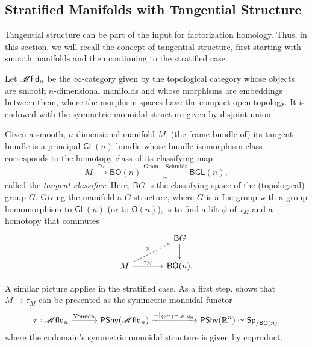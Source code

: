 \documentclass[../text]{subfiles}
\begin{document}
\subsection{Stratified Manifolds with Tangential Structure}

Tangential structure can be part of the input for factorization homology. Thus, in this section, we will recall the concept of tangential structure, first starting with smooth manifolds and then continuing to the stratified case.

\begin{definition}
    Let $\mfld_n$ be the $\infty$-category given by the topological category whose objects are smooth $n$-dimensional manifolds and whose morphisms are embeddings between them, where the morphism spaces have the compact-open topology. It is endowed with the symmetric monoidal structure given by disjoint union.
\end{definition}

Given a smooth, $n$-dimensional manifold $M$, (the frame bundle of) its tangent bundle is a principal $\mathsf{GL}(n)$-bundle whose bundle isomorphism class corresponds to the homotopy class of its classifying map
%
\begin{equation}
    M \xrightarrow{\ \ \tau_M \ \ } \mathsf{BO}(n) \xrightarrow[\simeq]{\mathrm{Gram-Schmidt}} \mathsf{BGL}(n),
\end{equation}
called the \emph{tangent classifier}. Here, $\mathsf{B}G$ is the classifying space of the (topological) group $G$. Giving the manifold a $G$-structure, where $G$ is a Lie group with a group homomorphism to $\mathsf{GL}(n)$ (or to $\mathsf{O}(n)$), is to find a lift $\phi$ of $\tau_M$ and a homotopy that commutes
%
\begin{equation}
    \begin{tikzcd}[column sep = large]
        & \mathsf{B}G \arrow[d] \\
        M \arrow[ru, dashed, "\phi"] \arrow[r, "\tau_M"] & \mathsf{BO}(n).
    \end{tikzcd}
\end{equation}

A similar picture applies in the stratified case. As a first step, \cite[Corollary 2.13]{af_fhtop} shows that $M\mapsto\tau_M$ can be presented as the symmetric monoidal functor
%
\begin{equation}
    \tau: \mfld_n \xrightarrow{\mathrm{Yoneda}} \mathsf{PShv}(\mfld_n) \xrightarrow{-|_{\{\mathbb{R}^n\} \subset \mfld_n}} \mathsf{PShv}(\mathbb{R}^n) \simeq \mathsf{Sp}_{/\mathsf{BO}(n)},
\end{equation}
where the codomain's symmetric monoidal structure is given by coproduct. 
\end{document}
